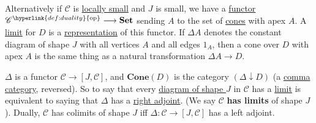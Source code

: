 \documentclass{article}
\let\to\longrightarrow
\begin{document}
Alternatively if $\mathscr{C}$ is \hyperlink{def:lsmall}{locally small} and $J$ is small, we have a \hyperlink{def:funct}{functor} $\mathscr{C}^{\hyperlink{def:duality}{\text{op}}} \to \mathbf{Set}$ sending $A$ to the set of \hyperlink{def:cone}{cones} with apex $A$.
A \hyperlink{def:limit}{limit} for $D$ is a \hyperlink{def:repr}{representation} of this functor.
If $\Delta A$ denotes the constant diagram of shape $J$ with all vertices $A$ and all edges $1_A$, then a cone over $D$ with apex $A$ is the same thing as a natural transformation $\Delta A \to D$.

$\Delta$ is a functor $\mathscr{C} \to [J, \mathscr{C}]$, and $\mathbf{Cone}(D)$ is the category $(\Delta \downarrow D)$ (a \hyperlink{def:comma}{comma category}, reversed).
So to say that every \hyperlink{def:diagram}{diagram of shape $J$} in $\mathscr{C}$ has a \hyperlink{def:limit}{limit} is equivalent to saying that $\Delta$ has a \hyperlink{def:adj}{right adjoint}.
(We say $\mathscr{C}$ \textbf{has limits} of shape $J$).
Dually, $\mathscr{C}$ has colimits of shape $J$ iff $\Delta: \mathscr{C} \to [J, \mathscr{C}]$ has a left adjoint.
\end{document}
